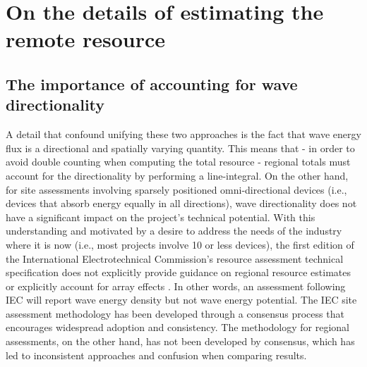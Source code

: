 \section{On the details of estimating the remote resource} \label{appendix:one-way-method}

\subsection{The importance of accounting for wave directionality} \label{appendix:directionality}

\hline


A detail that confound unifying these two approaches is the fact that wave energy flux is a directional and spatially varying quantity. This means that - in order to avoid double counting when computing the total resource - regional totals must account for the directionality by performing a line-integral. On the other hand, for site assessments involving sparsely positioned omni-directional devices (i.e., devices that absorb energy equally in all directions), wave directionality does not have a significant impact on the project’s technical potential. With this understanding and motivated by a desire to address the needs of the industry where it is now (i.e., most projects involve 10 or less devices), the first edition of the International Electrotechnical Commission’s resource assessment technical specification does not explicitly provide guidance on regional resource estimates or explicitly account for array effects \citep[]{internationalelectrotechnicalcommissionPart101Wave2015}. In other words, an assessment following IEC will report wave energy density but not wave energy potential. The IEC site assessment methodology has been developed through a consensus process that encourages widespread adoption and consistency. The methodology for regional assessments, on the other hand, has not been developed by consensus, which has led to inconsistent approaches and confusion when comparing results.


\hline


